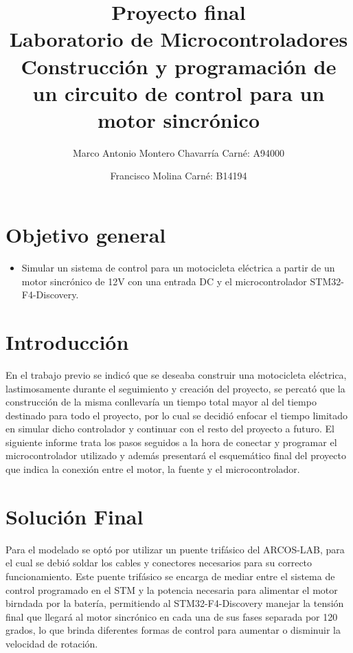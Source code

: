 \documentclass[letterpaper]{article}
\begin{document}
\title{Proyecto final\\ Laboratorio de Microcontroladores\\ Construcción y programación de un circuito de control para un motor sincrónico}
\author{
 Marco Antonio Montero Chavarrí­a Carné: A94000\\
 \and
 Francisco Molina Carné: B14194}
\maketitle

\section{Objetivo general}
\begin{itemize}
\item Simular un sistema de control para un motocicleta eléctrica a partir de un motor sincrónico de 12V con una entrada DC y el microcontrolador STM32-F4-Discovery.
\end{itemize}

\section{Introducción}

En el trabajo previo se indicó que se deseaba construir una motocicleta eléctrica, lastimosamente durante el seguimiento y creación del proyecto, se percató que la
construcción de la misma conllevaría un tiempo total mayor al del tiempo destinado para todo el proyecto, por lo cual se decidió enfocar el tiempo limitado
en simular dicho controlador y continuar con el resto del proyecto a futuro. El siguiente informe trata los pasos seguidos a la hora de conectar y programar el microcontrolador utilizado y además presentará el esquemático final del proyecto que indica la conexión entre el motor, la fuente y el microcontrolador.

\section{Solución Final}
Para el modelado se optó por utilizar un puente trifásico del ARCOS-LAB,  para el cual se debió soldar los cables y conectores necesarios para su correcto funcionamiento. Este puente trifásico se encarga de mediar entre el sistema de control programado en el STM y la potencia necesaria para alimentar el motor birndada por la batería, permitiendo al STM32-F4-Discovery manejar la tensión final que llegará al motor sincrónico en cada una de sus fases separada por 120 grados, lo que brinda diferentes formas de control para aumentar o disminuir la velocidad de rotación.
\end{document}
